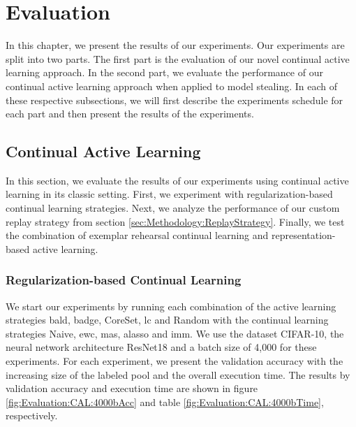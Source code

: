 
\chapter{Evaluation}
\label{ch:Evaluation}

In this chapter, we present the results of our experiments. Our experiments are split into two parts. The first part is the evaluation of our novel
continual active learning approach. In the second part, we evaluate the performance of our continual active learning approach when applied to model stealing.
In each of these respective subsections, we will first describe the experiments schedule for each part and then present the results of the experiments.



\section{Continual Active Learning}
\label{sec:CAL}
In this section, we evaluate the results of our experiments using continual active learning in its classic setting. First, we experiment with regularization-based
continual learning strategies. Next, we analyze the performance of our custom replay strategy from section \ref{sec:Methodology:ReplayStrategy}. Finally, we
test the combination of exemplar rehearsal continual learning and representation-based active learning.

\subsection{Regularization-based Continual Learning}
\label{sec:Evaluation:CAL:ALRegCL}
We start our experiments by running each combination of the active learning strategies \gls{bald}, \gls{badge}, CoreSet, \gls{lc} and Random with the continual learning
strategies Naive, \gls{ewc}, \gls{mas}, \gls{alasso} and \gls{imm}. We use the dataset CIFAR-10, the neural network architecture ResNet18 and a batch size of 4,000 for
these experiments. For each experiment, we present the validation accuracy with the increasing size of the labeled pool and the overall execution time.
The results by validation accuracy and execution time are shown in figure \ref{fig:Evaluation:CAL:4000bAcc} and table \ref{fig:Evaluation:CAL:4000bTime}, respectively.\par

